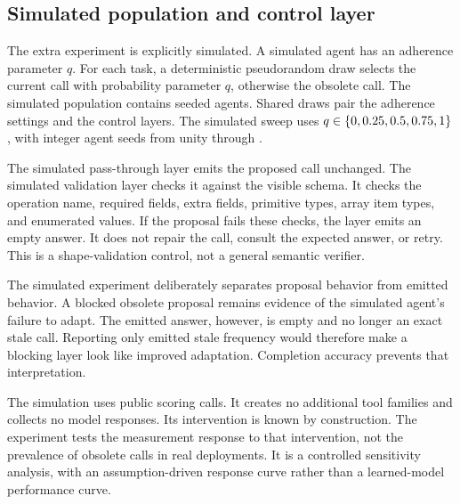 \documentclass{article}
\begin{document}
\subsection{Simulated population and control layer}
The extra experiment is explicitly simulated. A simulated agent has an adherence parameter $q$. For each task, a deterministic pseudorandom draw selects the current call with probability parameter $q$, otherwise the obsolete call. The simulated population contains \AgentCount{} seeded agents. Shared draws pair the adherence settings and the control layers. The simulated sweep uses $q \in \{0, 0.25, 0.5, 0.75, 1\}$, with integer agent seeds from unity through \AgentCount{}.\par
The simulated pass-through layer emits the proposed call unchanged. The simulated validation layer checks it against the visible schema. It checks the operation name, required fields, extra fields, primitive types, array item types, and enumerated values. If the proposal fails these checks, the layer emits an empty answer. It does not repair the call, consult the expected answer, or retry. This is a shape-validation control, not a general semantic verifier.\par
The simulated experiment deliberately separates proposal behavior from emitted behavior. A blocked obsolete proposal remains evidence of the simulated agent's failure to adapt. The emitted answer, however, is empty and no longer an exact stale call. Reporting only emitted stale frequency would therefore make a blocking layer look like improved adaptation. Completion accuracy prevents that interpretation.\par
The simulation uses \SimulationCalls{} public scoring calls. It creates no additional tool families and collects no model responses. Its intervention is known by construction. The experiment tests the measurement response to that intervention, not the prevalence of obsolete calls in real deployments. It is a controlled sensitivity analysis, with an assumption-driven response curve rather than a learned-model performance curve.\par
\end{document}
